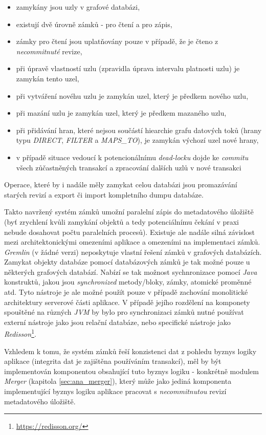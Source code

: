 \begin{itemize}
   \item zamykány jsou uzly v grafové databázi,
   \item existují dvě úrovně zámků - pro čtení a pro zápis,
   \item zámky pro čtení jsou uplatňovány pouze v případě, že je čteno z \textit{necommitnuté} revize,
   \item při úpravě vlastností uzlu (zpravidla úprava intervalu platnosti uzlu) je zamykán tento uzel,
   \item při vytváření novéhu uzlu je zamykán uzel, který je předkem nového uzlu,
   \item při mazání uzlu je zamykán uzel, který je předkem mazaného uzlu,
   \item při přidávání hran, které nejsou součástí hiearchie grafu datových toků (hrany typu \textit{DIRECT}, \textit{FILTER} a \textit{MAPS\_TO}), je zamykán výchozí uzel nové hrany,
   \item v případě situace vedoucí k potencionálnímu \textit{dead-locku} dojde ke \textit{commitu} všech zůčastněných transakcí a zpracování dalších uzlů v nové transakci
\end{itemize}

Operace, které by i nadále měly zamykat celou databázi jsou promazávání starých revizí a export či import kompletního dumpu databáze.

Takto navržený systém zámků umožní paralelní zápis do metadatového úložiště (byť zrychlení kvůli zamykání objektů a tedy potenciálnímu čekání v praxi nebude dosahovat počtu paralelních procesů). Existuje ale nadále silná závislost mezi architektonickými omezeními aplikace a omezeními na implementaci zámků. \textit{Gremlin} (v žádné verzi) neposkytuje vlastní řešení zámků v grafových databázích. Zamykat objekty databáze pomocí databázových zámků je tak možné pouze u některých grafových databází. Nabízí se tak možnost sychnronizace pomocí \textit{Java} konstruktů, jakou jsou \textit{synchronized} metody/bloky, zámky, atomické proměnné atd. Tyto nástroje je ale možné použít pouze v případě zachování monolitické architektury serverové části aplikace. V případě jejího rozdělení na  komponety spouštěné na různých \textit{JVM} by bylo pro synchronizaci zámků nutné používat externí nástroje jako jsou relační databáze, nebo specifické nástroje jako \textit{Redisson}\footnote{\url{https://redisson.org/}}.

Vzhledem k tomu, že systém zámků řeší konzistenci dat z pohledu byznys logiky aplikace (integrita dat je zajištěna používáním transakcí), měl by být implementován komponentou obsahující tuto byznys logiku - konkrétně modulem \textit{Merger} (kapitola \ref{sec:ana_merger}), který může jako jediná komponenta implementující byznys logiku aplikace pracovat s \textit{necommitnutou} revizí metadatového úložiště.

